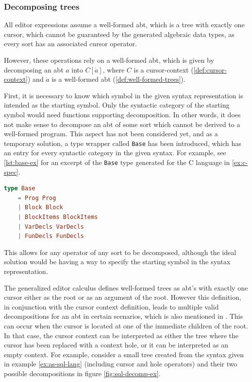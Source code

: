 \subsubsection{Decomposing trees}

All editor expressions assume a well-formed abt, which is a tree
with exactly one cursor, which cannot be guaranteed by the generated
algebraic data types, as every sort has an associated cursor operator.

However, these operations rely on a well-formed abt, which is given
by decomposing an abt $a$ into $C[\dot{a}]$, where $C$ is a
cursor-context (\cref{def:cursor-context}) and $\dot{a}$ is a
well-formed abt (\cref{def:well-formed-trees}).

First, it is necessary to know which symbol in the given syntax representation
is intended as the starting symbol. Only the syntactic category of the starting symbol
would need functions supporting decomposition.
In other words, it does not make sense to decompose an abt of some sort which
cannot be derived to a well-formed program.
This aspect has not been considered yet, and as a temporary solution,
a type wrapper called \texttt{Base} has been introduced, which has an entry for
every syntactic category in the given syntax. For example, see \cref{lst:base-ex}
for an excerpt of the \texttt{Base} type generated for the C language in
\cref{ex:c-spec}.

\begin{lstlisting}[language=elm,style=inline,caption={Example of the Base type},label={lst:base-ex}]
type Base
    = Prog Prog
    | Block Block
    | BlockItems BlockItems
    | VarDecls VarDecls
    | FunDecls FunDecls
\end{lstlisting}

This allows for any operator
of any sort to be decomposed, although the ideal solution would be having
a way to specify the starting symbol in the syntax representation.

The generalized editor calculus\cite{aalborg} defines well-formed trees as abt's
with exactly one cursor either as the root or as an argument of the root.
However this definition, in conjunction with the cursor context definition,
leads to multiple valid decompositions for an abt in certain scenarios,
which is also mentioned in \cite{aalborg}. This can occur when the cursor is located
at one of the immediate children of the root. In that case, the cursor context
can be interpreted as either the tree where the cursor has been replaced with a
context hole, or it can be interpreted as an empty context.
For example, consider a small tree created from the syntax given in
example \cref{ex:as-sql-lang} (including cursor and hole operators) and
their two possible decompositions in figure \cref{fig:sql-decomp-ex}.

